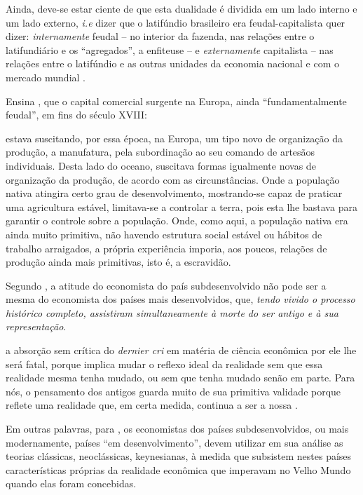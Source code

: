 \documentclass[
	12pt,				%
	oneside,			%
	a4paper,			%
	chapter=TITLE,		%
	section=TITLE,		%
	english,			%
	brazil				%
	]{abntex2}
\begin{document}
\begin{refsection}
Ainda, deve-se estar ciente de que esta dualidade é dividida em um lado interno
e um lado externo, \emph{i.e} dizer que o latifúndio brasileiro era
feudal-capitalista quer dizer: \emph{internamente} feudal -- no interior da fazenda,
nas relações entre o latifundiário e os ``agregados'', a enfiteuse -- e
\emph{externamente} capitalista -- nas relações entre o latifúndio e as outras
unidades da economia nacional e com o mercado mundial \autocite[
p.~297]{dualidade-basica}.

Ensina \textcite[p.~307-308]{dualidade-basica}, que o capital comercial surgente na
Europa, ainda ``fundamentalmente feudal'', em fins do século XVIII:
\begin{citacao}
estava suscitando, por essa época, na Europa, um tipo novo de organização da
produção, a manufatura, pela subordinação ao seu comando de artesãos
individuais. Desta lado do oceano, suscitava formas igualmente novas de
organização da produção, de acordo com as circunstâncias. Onde a população
nativa atingira certo grau de desenvolvimento, mostrando-se capaz de praticar
uma agricultura estável, limitava-se a controlar a terra, pois esta lhe bastava
para garantir o controle sobre a população. Onde, como aqui, a população nativa
era ainda muito primitiva, não havendo estrutura social estável ou hábitos de
trabalho arraigados, a própria experiência imporia, aos poucos, relações de
produção ainda mais primitivas, isto é, a escravidão.
\end{citacao}
Segundo \textcite[p.~206]{rangel1956}, a atitude do economista do país subdesenvolvido
não pode ser a mesma do economista dos países mais desenvolvidos, que, \emph{tendo
vivido o processo histórico completo, assistiram simultaneamente à morte do ser
antigo e à sua representação}.
\begin{citacao} 
a absorção sem crítica do \emph{dernier cri} em matéria de ciência econômica por
ele lhe será fatal, porque implica mudar o reflexo ideal da realidade sem que
essa realidade mesma tenha mudado, ou sem que tenha mudado senão em parte. Para
nós, o pensamento dos antigos guarda muito de sua primitiva validade porque
reflete uma realidade que, em certa medida, continua a ser a nossa
\cite[p.~206-207]{rangel1956}.
\end{citacao}
Em outras palavras, para \textcite{rangel1956}, os economistas dos países
subdesenvolvidos, ou mais modernamente, países ``em desenvolvimento'', devem
utilizar em sua análise as teorias clássicas, neoclássicas, keynesianas, à
medida que subsistem nestes países características próprias da realidade
econômica que imperavam no Velho Mundo quando elas foram concebidas.


\end{refsection}
\end{document}
